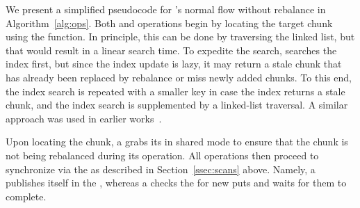 We present a simplified pseudocode for \sys's normal flow without rebalance in Algorithm~\ref{alg:ops}. 
Both  and  operations begin by locating the target chunk using the  function. In principle, this can be done by traversing the linked list, but that would result in a linear search time. To expedite the search,    searches the index first, but since the index update is lazy, it may return a stale chunk that has already been replaced by rebalance or miss newly added chunks. To this end, the index search is repeated with a smaller key in case the index returns a stale chunk, and the index search is supplemented by a linked-list traversal. A similar approach was used in earlier works~\cite{kiwi,tdsl}. 

Upon locating the chunk,  a  grabs its  in shared mode to ensure that the chunk is not being rebalanced during its operation. 
All operations then proceed to synchronize via the  
as described in Section~\ref{ssec:scans} above. Namely, a  publishes itself in the  , whereas a  
checks the   for new puts and waits for them to complete. 

